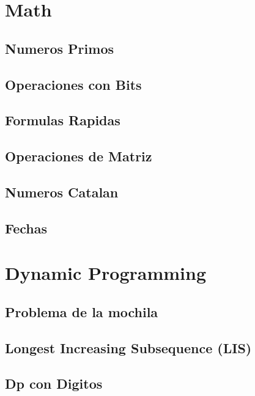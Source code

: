 \section{Math}
\subsection{Numeros Primos}
\raggedbottom
\hrulefill
\subsection{Operaciones con Bits}
\raggedbottom
\hrulefill
\subsection{Formulas Rapidas}
\raggedbottom
\hrulefill
\subsection{Operaciones de Matriz}
\raggedbottom
\hrulefill
\subsection{Numeros Catalan}
\raggedbottom
\hrulefill
\subsection{Fechas}
\raggedbottom
\hrulefill
\newpage

\section{Dynamic Programming}
\subsection{Problema de la mochila}
\raggedbottom
\hrulefill
\subsection{Longest Increasing Subsequence (LIS)}
\raggedbottom
\hrulefill
\subsection{Dp con Digitos}
\raggedbottom
\hrulefill

